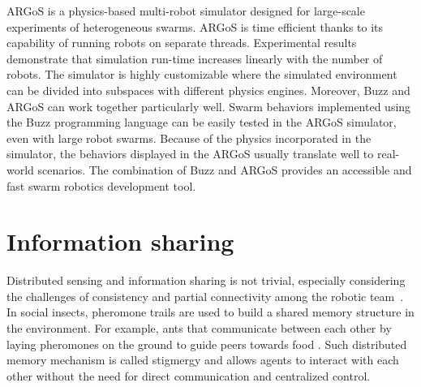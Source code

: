 ARGoS \cite{Pinciroli:SI2012} is a physics-based multi-robot simulator designed for large-scale experiments of heterogeneous swarms. ARGoS is time efficient thanks to its capability of running robots on separate threads. Experimental results demonstrate that simulation run-time increases linearly with the number of robots. The simulator is highly customizable where the simulated environment can be divided into subspaces with different physics engines. Moreover, Buzz and ARGoS can work together particularly well. Swarm behaviors implemented using the Buzz programming language can be easily tested in the ARGoS simulator, even with large robot swarms. Because of the physics incorporated in the simulator, the behaviors displayed in the ARGoS usually translate well to real-world scenarios. The combination of Buzz and ARGoS provides an accessible and fast swarm robotics development tool. 

\section{Information sharing}
Distributed sensing and information sharing is not trivial, especially considering the challenges of consistency and partial connectivity among the
robotic team~\cite{amigoni2017multirobot,otte2018emergent}. In social insects, pheromone trails are used to build a shared memory structure in the environment. For example, ants that communicate between each other by laying pheromones on the ground to guide peers towards food \cite{bonabeau1999swarm}. Such distributed memory mechanism is called stigmergy \cite{heylighen2016stigmergy1, heylighen2016stigmergy2} and allows agents to interact with each other without the need for direct communication and centralized control. 

